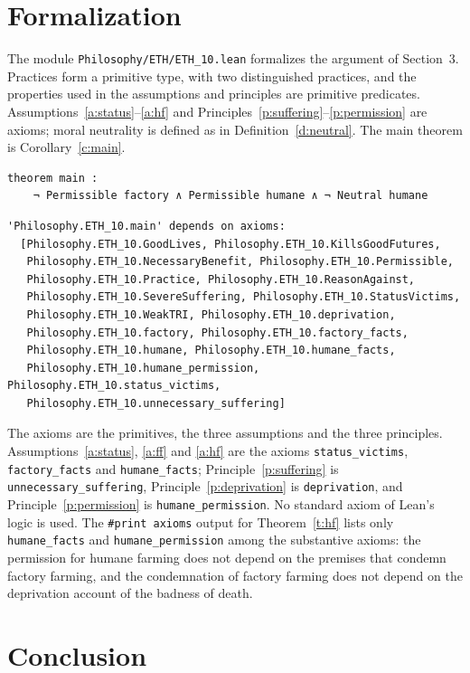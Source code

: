 \documentclass{situationist-preprint}
\begin{document}
\section{Formalization}

The module \nolinkurl{Philosophy/ETH/ETH_10.lean} formalizes the argument of Section~3. Practices form a primitive type, with two distinguished practices, and the properties used in the assumptions and principles are primitive predicates. Assumptions~\ref{a:status}--\ref{a:hf} and Principles~\ref{p:suffering}--\ref{p:permission} are axioms; moral neutrality is defined as in Definition~\ref{d:neutral}. The main theorem is Corollary~\ref{c:main}.

\begin{lstlisting}
theorem main :
    ¬ Permissible factory ∧ Permissible humane ∧ ¬ Neutral humane
\end{lstlisting}

\begin{lstlisting}
'Philosophy.ETH_10.main' depends on axioms:
  [Philosophy.ETH_10.GoodLives, Philosophy.ETH_10.KillsGoodFutures,
   Philosophy.ETH_10.NecessaryBenefit, Philosophy.ETH_10.Permissible,
   Philosophy.ETH_10.Practice, Philosophy.ETH_10.ReasonAgainst,
   Philosophy.ETH_10.SevereSuffering, Philosophy.ETH_10.StatusVictims,
   Philosophy.ETH_10.WeakTRI, Philosophy.ETH_10.deprivation,
   Philosophy.ETH_10.factory, Philosophy.ETH_10.factory_facts,
   Philosophy.ETH_10.humane, Philosophy.ETH_10.humane_facts,
   Philosophy.ETH_10.humane_permission, Philosophy.ETH_10.status_victims,
   Philosophy.ETH_10.unnecessary_suffering]
\end{lstlisting}

The axioms are the primitives, the three assumptions and the three principles. Assumptions~\ref{a:status}, \ref{a:ff} and \ref{a:hf} are the axioms \texttt{status\_victims}, \texttt{factory\_facts} and \texttt{humane\_facts}; Principle~\ref{p:suffering} is \texttt{unnecessary\_suffering}, Principle~\ref{p:deprivation} is \texttt{deprivation}, and Principle~\ref{p:permission} is \texttt{humane\_permission}. No standard axiom of Lean's logic is used. The \texttt{\#print axioms} output for Theorem~\ref{t:hf} lists only \texttt{humane\_facts} and \texttt{humane\_permission} among the substantive axioms: the permission for humane farming does not depend on the premises that condemn factory farming, and the condemnation of factory farming does not depend on the deprivation account of the badness of death.

\section{Conclusion}
\end{document}
